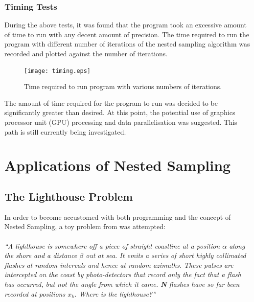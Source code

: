 \documentclass[a4paper,12pt]{article}
\begin{document}
\subsubsection{Timing Tests}
During the above tests, it was found that the program took an excessive amount of time to run with any decent amount of precision.  The time required to run the program with different number of iterations of the nested sampling algorithm was recorded and plotted against the number of iterations. 


\begin{figure}[!h]
 \begin{center}
  \texttt{[image: timing.eps]}
  \caption{Time required to run program with various numbers of iterations.}
 \end{center}
\end{figure}


The amount of time required for the program to run was decided to be significantly greater than desired.  At this point, the potential use of graphics processor unit (GPU) processing and data parallelisation was suggested.  This path is still currently being investigated.  

\section{Applications of Nested Sampling}
\subsection{The Lighthouse Problem}
In order to become accustomed with both programming and the concept of Nested Sampling, a toy problem from \cite{sivia} was attempted: \\ \\
\textit{``A lighthouse is somewhere off a piece of straight coastline at a position $\alpha$ along the shore and a distance $\beta$ out at sea. It emits a series of short highly collimated flashes at random intervals and hence at random azimuths. These pulses are intercepted on the coast by photo-detectors that record only the fact that a flash has occurred, but not the angle from which it came. \textbf{N} flashes have so far been recorded at positions $x_{k}$. Where is the lighthouse?''} \cite{sivia}
\\ \\
\end{document}
